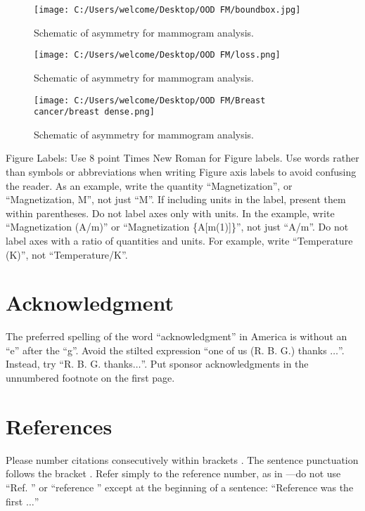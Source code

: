 \documentclass[conference]{IEEEtran}
\begin{document}
\begin{figure}[htbp]
\centerline{\texttt{[image: C:/Users/welcome/Desktop/OOD FM/boundbox.jpg]}}
\caption{Schematic of asymmetry for mammogram analysis.}
\label{fig}
\end{figure}



\begin{figure}[htbp]
\centerline{\texttt{[image: C:/Users/welcome/Desktop/OOD FM/loss.png]}}
\caption{Schematic of asymmetry for mammogram analysis.}
\label{fig}
\end{figure}
\begin{figure}[htbp]
\centerline{\texttt{[image: C:/Users/welcome/Desktop/OOD FM/Breast cancer/breast dense.png]}}
\caption{Schematic of asymmetry for mammogram analysis.}
\label{fig}
\end{figure}

Figure Labels: Use 8 point Times New Roman for Figure labels. Use words 
rather than symbols or abbreviations when writing Figure axis labels to 
avoid confusing the reader. As an example, write the quantity 
``Magnetization'', or ``Magnetization, M'', not just ``M''. If including 
units in the label, present them within parentheses. Do not label axes only 
with units. In the example, write ``Magnetization (A/m)'' or ``Magnetization 
\{A[m(1)]\}'', not just ``A/m''. Do not label axes with a ratio of 
quantities and units. For example, write ``Temperature (K)'', not 
``Temperature/K''.

\section*{Acknowledgment}

The preferred spelling of the word ``acknowledgment'' in America is without 
an ``e'' after the ``g''. Avoid the stilted expression ``one of us (R. B. 
G.) thanks $\ldots$''. Instead, try ``R. B. G. thanks$\ldots$''. Put sponsor 
acknowledgments in the unnumbered footnote on the first page.

\section*{References}

Please number citations consecutively within brackets \cite{b1}. The 
sentence punctuation follows the bracket \cite{b2}. Refer simply to the reference 
number, as in \cite{b3}---do not use ``Ref. \cite{b3}'' or ``reference \cite{b3}'' except at 
the beginning of a sentence: ``Reference \cite{b3} was the first $\ldots$''
\end{document}
